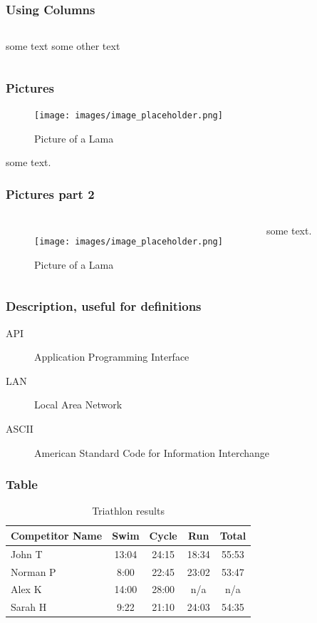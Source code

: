 \documentclass{beamer} %
\begin{document}
\begin{frame}
    \frametitle{Using Columns}
    \begin{columns}
            some text
            some other text
    \end{columns}
\end{frame}

\begin{frame}
    \frametitle{Pictures}
    \begin{figure}
        \texttt{[image: images/image\_placeholder.png]}
        \caption{Picture of a Lama}
    \end{figure}
    some text.
\end{frame}

\begin{frame}
    \frametitle{Pictures part 2}
    \begin{columns}
            \begin{figure}
                \texttt{[image: images/image\_placeholder.png]}
                \caption{Picture of a Lama}
            \end{figure}
        some text.
    \end{columns}
\end{frame}

\begin{frame}
    \frametitle{Description, useful for definitions}
    \begin{description}
        \item[API] Application Programming Interface
        \item[LAN] Local Area Network
        \item[ASCII] American Standard Code for Information Interchange
    \end{description}
\end{frame}

\begin{frame}
    \frametitle{Table}
    \begin{table}
        \begin{tabular}{l | c | c | c | c }
            Competitor Name & Swim & Cycle & Run & Total \\
            \hline \hline
            John T & 13:04 & 24:15 & 18:34 & 55:53 \\ 
            Norman P & 8:00 & 22:45 & 23:02 & 53:47\\
            Alex K & 14:00 & 28:00 & n/a & n/a\\
            Sarah H & 9:22 & 21:10 & 24:03 & 54:35 
        \end{tabular}
        \caption{Triathlon results}
    \end{table}
\end{frame}
\end{document}
